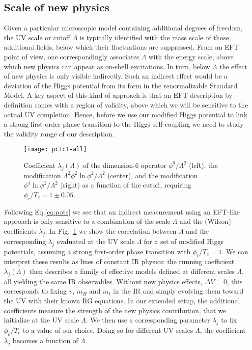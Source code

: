 \documentclass[aps,prd,11pt,tightenlines,superscriptaddress,nofootinbib,preprintnumbers,notitlepage]{revtex4-1}
\begin{document}
\subsection{Scale of new physics}
\label{sec:valid}

Given a particular microscopic model containing additional degrees of
freedom, the UV scale or cutoff $\Lambda$ is typically identified with
the mass scale of those additional fields, below which their
fluctuations are suppressed.  From an EFT point of view, one
correspondingly associates $\Lambda$ with the energy scale, above
which new physics can appear as on-shell excitations. In turn, below
$\Lambda$ the effect of new physics is only visible indirectly. Such
an indirect effect would be a deviation of the Higgs potential from
its form in the renormalizable Standard Model. A key aspect of this
kind of approach is that an EFT description by definition comes with a
region of validity, above which we will be sensitive to the actual UV
completion. Hence, before we use our modified Higgs potential to link
a strong first-order phase transition to the Higgs self-coupling we
need to study the validity range of our description. 

\begin{figure}[t]
 \texttt{[image: pctc1-all]}
 \caption{Coefficient $\lambda_j(\Lambda)$ of the dimension-6
   operator $\phi^6/\Lambda^2$ (left), the modification $\Lambda^2
   \phi^2 \ln \phi^2/\Lambda^2$ (center), and the modification $\phi^4
   \ln \phi^2/\Lambda^2$ (right) as a function of the cutoff,
   requiring $\phi_c/T_c = 1 \pm 0.05$.}
 \label{fig:pctc1}
\end{figure}

Following Eq.\eqref{eq:pots} we see that an indirect measurement using
an EFT-like approach is only sensitive to a combination of the scale
$\Lambda$ and the (Wilson) coefficients $\lambda_j$. In
Fig.~\ref{fig:pctc1} we show the correlation between
$\Lambda$ and the corresponding $\lambda_j$ evaluated at the UV scale
$\Lambda$ for a set of modified Higgs potentials, assuming a strong
first-order phase transition with $\phi_c/T_c = 1$.  We can interpret
these results as lines of constant IR physics: the running coefficient
$\lambda_j(\Lambda)$ then describes a family of effective models
defined at different scales $\Lambda$, all yielding the same IR observables.
Without new physics effects, $\Delta V = 0$, this corresponds
to fixing $v$, $m_H$ and $m_t$ in the IR and simply evolving them
toward the UV with their known RG equations. In our extended setup, the
additional coefficients measure the strength of the new physics
contribution, that we initialize at the UV scale $\Lambda$.  We then
use a corresponding parameter $\lambda_j$ to fix $\phi_c/T_c$ to a value of our choice.
Doing so for different UV scales $\Lambda$, the coefficient $\lambda_j$ becomes a function of
$\Lambda$.\medskip
\end{document}

